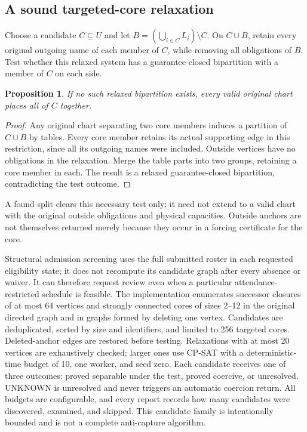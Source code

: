 \documentclass[11pt,a4paper]{article}
\newtheorem{proposition}[theorem]{Proposition}
\theoremstyle{definition}\newtheorem{definition}[theorem]{Definition}
\theoremstyle{remark}\newtheorem{remark}[theorem]{Remark}
\begin{document}
\subsection{A sound targeted-core relaxation}\label{sec:screen}
Choose a candidate $C\subseteq U$ and let $B=(\bigcup_{i\in C}L_i)\setminus C$. On $C\cup B$, retain every original outgoing name of each member of $C$, while removing all obligations of $B$. Test whether this relaxed system has a guarantee-closed bipartition with a member of $C$ on each side.
\begin{proposition}\label{prop:target}
If no such relaxed bipartition exists, every valid original chart places all of $C$ together.
\end{proposition}
\begin{proof}
Any original chart separating two core members induces a partition of $C\cup B$ by tables. Every core member retains its actual supporting edge in this restriction, since all its outgoing names were included. Outside vertices have no obligations in the relaxation. Merge the table parts into two groups, retaining a core member in each. The result is a relaxed guarantee-closed bipartition, contradicting the test outcome.
\end{proof}
A found split clears this necessary test only; it need not extend to a valid chart with the original outside obligations and physical capacities. Outside anchors are not themselves returned merely because they occur in a forcing certificate for the core.

Structural admission screening uses the full submitted roster in each requested eligibility state; it does not recompute its candidate graph after every absence or waiver. It can therefore request review even when a particular attendance-restricted schedule is feasible. The implementation enumerates successor closures of at most 64 vertices and strongly connected cores of sizes 2--12 in the original directed graph and in graphs formed by deleting one vertex. Candidates are deduplicated, sorted by size and identifiers, and limited to 256 targeted cores. Deleted-anchor edges are restored before testing. Relaxations with at most 20 vertices are exhaustively checked; larger ones use CP-SAT with a deterministic-time budget of 10, one worker, and seed zero. Each candidate receives one of three outcomes: proved separable under the test, proved coercive, or unresolved. UNKNOWN is unresolved and never triggers an automatic coercion return. All budgets are configurable, and every report records how many candidates were discovered, examined, and skipped. This candidate family is intentionally bounded and is not a complete anti-capture algorithm.
\end{document}
